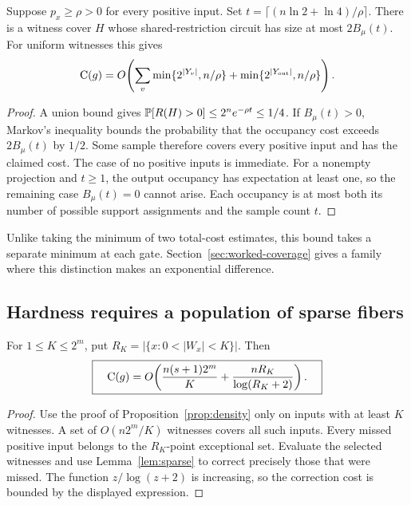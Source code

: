\begin{corollary}
\label{cor:density-sharing}
Suppose $p_x\ge\rho>0$ for every positive input. Set
$t=\lceil(n\ln2+\ln4)/\rho\rceil$. There is a witness cover $H$
whose shared-restriction circuit has size at most $2B_\mu(t)$.
For uniform witnesses this gives
\[
 \mathrm{C}(g)=O\!\left(
   \sum_v\min\{2^{|Y_v|},n/\rho\}
   +\min\{2^{|Y_{\mathrm{out}}|},n/\rho\}\right).
\]
\end{corollary}
\begin{proof}
A union bound gives $\mathbb{P}[R(H)>0]\le2^ne^{-\rho t}\le1/4$.
If $B_\mu(t)>0$, Markov's inequality bounds the probability that
the occupancy cost exceeds $2B_\mu(t)$ by $1/2$. Some sample therefore
covers every positive input and has the claimed cost. The case of no
positive inputs is immediate. For a nonempty projection and $t\ge1$,
the output occupancy has expectation at least one, so the remaining
case $B_\mu(t)=0$ cannot arise. Each occupancy is at most both its
number of possible support assignments and the sample count $t$.
\end{proof}

Unlike taking the minimum of two total-cost estimates, this bound
takes a separate minimum at each gate. Section~\ref{sec:worked-coverage}
gives a family where this distinction makes an exponential difference.

\subsection{Hardness requires a population of sparse fibers}

\begin{corollary}
\label{cor:fiber-profile}
For $1\le K\le2^m$, put
$R_K=|\{x:0<|W_x|<K\}|$. Then
\[
 \boxed{\quad
 \mathrm{C}(g)=O\!\left(\frac{n(s+1)2^m}{K}
            +\frac{nR_K}{\log(R_K+2)}\right).
 \quad}
\]
\end{corollary}
\begin{proof}
Use the proof of Proposition~\ref{prop:density} only on inputs with
at least $K$ witnesses. A set of $O(n2^m/K)$ witnesses covers all
such inputs. Every missed positive input belongs to the $R_K$-point
exceptional set. Evaluate the selected witnesses and use
Lemma~\ref{lem:sparse} to correct precisely those that were missed.
The function $z/\log(z+2)$ is increasing, so the correction cost is
bounded by the displayed expression.
\end{proof}

